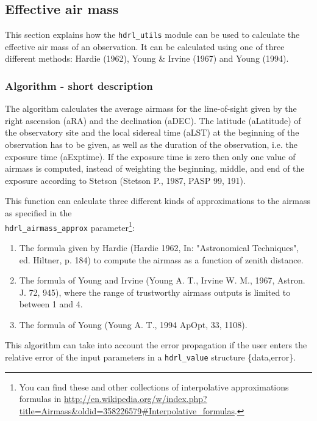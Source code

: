 \subsection{Effective air mass}
\label{airmass:main}

This section explains how the \verb+hdrl_utils+ module can be used to calculate the effective air mass of an observation. It can be calculated using one of three different methods: 
Hardie (1962), Young \& Irvine (1967) and Young (1994).


\subsubsection{Algorithm - short description}

The algorithm calculates the average airmass for the line-of-sight given by the right ascension (aRA) and the declination (aDEC). The latitude (aLatitude) of the observatory site 
and the local sidereal time (aLST) at the beginning of the observation has to be given, as well as the duration of the observation, i.e. the exposure time (aExptime). 
If the exposure time is zero then only one value of airmass is computed, instead of weighting the beginning, middle, and end of the exposure according to Stetson (Stetson P., 1987, PASP 99, 191).

This function can calculate three different kinds of approximations to the airmass as specified in the\\ 
\verb+hdrl_airmass_approx+ parameter\footnote{You can find these and other collections of interpolative approximations formulas in \url{http://en.wikipedia.org/w/index.php?title=Airmass\&oldid=358226579\#Interpolative_formulas}.}:
\begin{enumerate}
  \item The formula given by Hardie (Hardie 1962, In: "Astronomical Techniques", ed. Hiltner, p. 184) to compute the airmass as a function of zenith distance.
  \item The formula of Young and Irvine (Young A. T., Irvine W. M., 1967, Astron. J. 72, 945), where the range of trustworthy airmass outputs is limited to between 1 and 4.
  \item The formula of Young (Young A. T., 1994 ApOpt, 33, 1108).
 \end{enumerate}  

This algorithm can take into account the error propagation if the user enters the relative error of the input parameters in a \verb+hdrl_value+ structure \{data,error\}.



